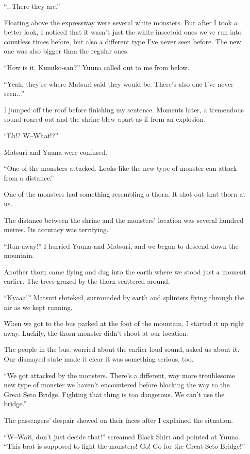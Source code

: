 ``...There they are.''

Floating above the expressway were several white monsters. But after I took a better look, I noticed that it wasn't just the white insectoid ones we've run into countless times before, but also a different type I've never seen before. The new one was also bigger than the regular ones.

``How is it, Kumiko-san?'' Yuuna called out to me from below.

``Yeah, they're where Matsuri said they would be. There's also one I've never seen...''

I jumped off the roof before finishing my sentence. Moments later, a tremendous sound roared out and the shrine blew apart as if from an explosion.

``Eh!? W--What!?''

Matsuri and Yuuna were confused.

``One of the monsters attacked. Looks like the new type of monster can attack from a distance.''

One of the monsters had something resembling a thorn. It shot out that thorn at us.

The distance between the shrine and the monsters' location was several hundred metres. Its accuracy was terrifying.

``Run away!'' I hurried Yuuna and Matsuri, and we began to descend down the mountain.

Another thorn came flying and dug into the earth where we stood just a moment earlier. The trees grazed by the thorn scattered around.

``Kyaaa!'' Matsuri shrieked, surrounded by earth and splinters flying through the air as we kept running.

When we got to the bus parked at the foot of the mountain, I started it up right away. Luckily, the thorn monster didn't shoot at our location.

The people in the bus, worried about the earlier loud sound, asked us about it. Our dismayed state made it clear it was something serious, too.

``We got attacked by the monsters. There's a different, way more troublesome new type of monster we haven't encountered before blocking the way to the Great Seto Bridge. Fighting that thing is too dangerous. We can't use the bridge.''

The passengers' despair showed on their faces after I explained the situation.

``W--Wait, don't just decide that!'' screamed Black Shirt and pointed at Yuuna. ``This brat is supposed to fight the monsters! Go! Go for the Great Seto Bridge!''

